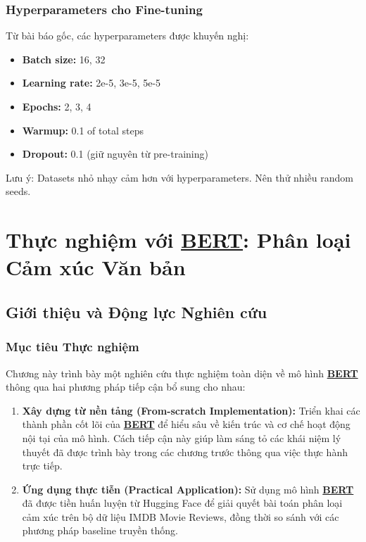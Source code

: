 \subsubsection{Hyperparameters cho Fine-tuning}
Từ bài báo gốc, các hyperparameters được khuyến nghị:
\begin{itemize}
    \item \textbf{Batch size:} 16, 32
    \item \textbf{Learning rate:} 2e-5, 3e-5, 5e-5 
    \item \textbf{Epochs:} 2, 3, 4
    \item \textbf{Warmup:} 0.1 of total steps
    \item \textbf{Dropout:} 0.1 (giữ nguyên từ pre-training)
\end{itemize}

Lưu ý: Datasets nhỏ nhạy cảm hơn với hyperparameters.
Nên thử nhiều random seeds.

\section{Thực nghiệm với \hyperref[acro:bert]{\textbf{BERT}}: Phân loại Cảm xúc Văn bản}
\label{sec:thuc_nghiem_bert}

\subsection{Giới thiệu và Động lực Nghiên cứu}
\label{ssec:gioi_thieu_dong_luc}

\subsubsection{Mục tiêu Thực nghiệm}
Chương này trình bày một nghiên cứu thực nghiệm toàn diện về mô hình \hyperref[acro:bert]{\textbf{BERT}} thông qua hai phương pháp tiếp cận bổ sung cho nhau:

\begin{enumerate}
    \item \textbf{Xây dựng từ nền tảng (From-scratch Implementation):} Triển khai các thành phần cốt lõi của \hyperref[acro:bert]{\textbf{BERT}} để hiểu sâu về kiến trúc và cơ
    chế hoạt động nội tại của mô hình. Cách tiếp cận này giúp làm sáng tỏ các khái niệm lý thuyết đã được trình bày trong các chương trước thông qua việc thực hành trực tiếp.
    \item \textbf{Ứng dụng thực tiễn (Practical Application):} Sử dụng mô hình \hyperref[acro:bert]{\textbf{BERT}} đã được tiền huấn luyện từ Hugging Face để giải quyết bài toán phân loại cảm xúc trên bộ dữ liệu IMDB Movie Reviews, đồng thời so sánh với các phương pháp baseline truyền thống.
\end{enumerate}

